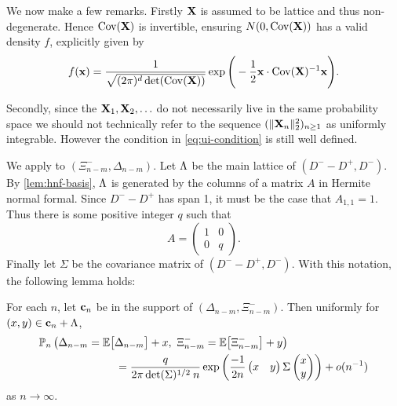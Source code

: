 We now make a few remarks. Firstly ${\mathbf X}$ is assumed to be lattice and thus non-degenerate. Hence $\operatorname{Cov}({\mathbf X})$ is invertible, ensuring $N(0, \operatorname{Cov}({\mathbf X}))$ has a valid density $f$, explicitly given by
\begin{equation*}
    f({\mathbf x}) = \frac{1}{\sqrt{(2 \pi)^d \det(\operatorname{Cov}({\mathbf X}))}}
    \exp \Bigg(
        -\frac{1}{2} {\mathbf x} \cdot \operatorname{Cov}({\mathbf X})^{-1} {\mathbf x}
        \Bigg).
\end{equation*}

Secondly, since the ${\mathbf X}_1, {\mathbf X}_2, \ldots$ do not necessarily live in the same probability space we should not technically refer to the sequence $(\lVert{\mathbf X}_n\rVert_2^2)_{n \geq 1}$ as uniformly integrable. However the condition in \cref{eq:ui-condition} is still well defined. 

We apply  to $(\Xi_{n-m}^-, \Delta_{n-m})$. Let $\Lambda$ be the main lattice of $(D^- - D^+, D^-)$. By \cref{lem:hnf-basis}, $\Lambda$ is generated by the columns of a matrix $A$ in Hermite normal formal. Since $D^- - D^+$ has span 1, it must be the case that $A_{1, 1} = 1$. Thus there is some positive integer $q$ such that
\begin{equation*}
    A = \begin{pmatrix}
        1 & 0 \\ 
        0 & q
    \end{pmatrix}.
\end{equation*}
Finally let $\Sigma$ be the covariance matrix of $(D^- - D^+, D^-)$. With this notation, the following lemma holds:
\begin{lemma}
    \label{lem:bivar-llt}
    For each $n$, let ${\mathbf c}_n$ be in the support of $(\Delta_{n-m}, \Xi^-_{n-m})$. Then uniformly for $(x, y) \in {\mathbf c}_n + \Lambda$,
    \begin{align*}
        &\P_n\left(
            \Delta_{n-m} = \E \big[ \Delta_{n-m} \big] + x, \ 
            \Xi^-_{n-m} = \E \big[ \Xi^-_{n-m} \big] + y
        \right)  \nonumber \\
        &\hspace{7em} = \frac{q}{2\pi \det(\Sigma)^{1/2} \: n} \exp\left( 
            \frac{-1}{2n}
            \begin{pmatrix}
                x & y
            \end{pmatrix}
            \Sigma
            \begin{pmatrix}
                x \\ y
            \end{pmatrix}
        \right)
        + \littleo( n^{-1} )
    \end{align*}
    as $n \to \infty$.
\end{lemma}
